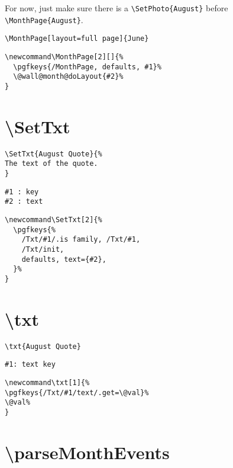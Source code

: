 \documentclass[11pt,oneside]{memoir-article}
\begin{document}
For now, just make sure there is a \texttt{\textbackslash{}SetPhoto\{August\}} before \texttt{\textbackslash{}MonthPage\{August\}}.

\begin{verbatim}
\MonthPage[layout=full page]{June}
\end{verbatim}


\begin{verbatim}
\newcommand\MonthPage[2][]{%
  \pgfkeys{/MonthPage, defaults, #1}%
  \@wall@month@doLayout{#2}%
}
\end{verbatim}

\section{\textbackslash SetTxt}
\label{sec:org79e062d}

\begin{verbatim}
\SetTxt{August Quote}{%
The text of the quote.
}
\end{verbatim}


\begin{verbatim}
#1 : key
#2 : text
\end{verbatim}


\begin{verbatim}
\newcommand\SetTxt[2]{%
  \pgfkeys{%
    /Txt/#1/.is family, /Txt/#1,
    /Txt/init,
    defaults, text={#2},
  }%
}
\end{verbatim}

\section{\textbackslash txt}
\label{sec:orgc34fee8}

\begin{verbatim}
\txt{August Quote}
\end{verbatim}


\begin{verbatim}
#1: text key
\end{verbatim}


\begin{verbatim}
\newcommand\txt[1]{%
\pgfkeys{/Txt/#1/text/.get=\@val}%
\@val%
}
\end{verbatim}

\section{\textbackslash parseMonthEvents}
\label{sec:org8268055}
\end{document}
